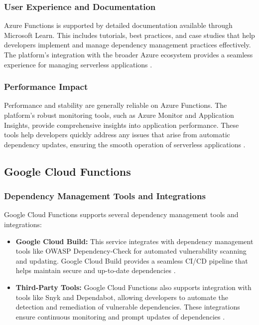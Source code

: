 \documentclass[sigconf]{acmart}
\begin{document}
\subsubsection{User Experience and Documentation}

Azure Functions is supported by detailed documentation available through Microsoft Learn. This includes tutorials, best practices, and case studies that help developers implement and manage dependency management practices effectively. The platform's integration with the broader Azure ecosystem provides a seamless experience for managing serverless applications \cite{azureLearn2023}.

\subsubsection{Performance Impact}

Performance and stability are generally reliable on Azure Functions. The platform's robust monitoring tools, such as Azure Monitor and Application Insights, provide comprehensive insights into application performance. These tools help developers quickly address any issues that arise from automatic dependency updates, ensuring the smooth operation of serverless applications \cite{azurePerformance2023}.

\subsection{Google Cloud Functions}

\subsubsection{Dependency Management Tools and Integrations}

Google Cloud Functions supports several dependency management tools and integrations:

\begin{itemize}
    \item \textbf{Google Cloud Build:} This service integrates with dependency management tools like OWASP Dependency-Check for automated vulnerability scanning and updating. Google Cloud Build provides a seamless CI/CD pipeline that helps maintain secure and up-to-date dependencies \cite{googleBuild2023}.
    \item \textbf{Third-Party Tools:} Google Cloud Functions also supports integration with tools like Snyk and Dependabot, allowing developers to automate the detection and remediation of vulnerable dependencies. These integrations ensure continuous monitoring and prompt updates of dependencies \cite{googlesnyk2023}.
\end{itemize}
\end{document}
